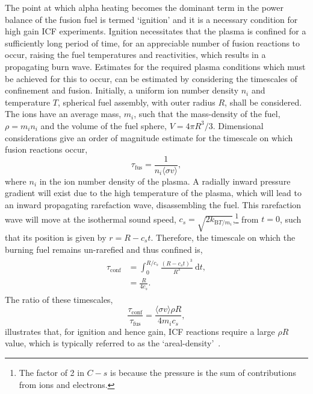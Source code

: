 The point at which alpha heating becomes the dominant term in the power balance of the fusion fuel is termed `ignition' and it is a necessary condition for high gain \ac{ICF} experiments.
Ignition necessitates that the plasma is confined for a sufficiently long period of time, for an appreciable number of fusion reactions to occur, raising the fuel temperatures and reactivities, which results in a propagating burn wave.
Estimates for the required plasma conditions which must be achieved for this to occur, can be estimated by considering the timescales of confinement and fusion.
Initially, a uniform ion number density $n_i$ and temperature $T$, spherical fuel assembly, with outer radius $R$, shall be considered.
The ions have an average mass, $m_i$, such that the mass-density of the fuel, $\rho = m_i n_i$ and the volume of the fuel sphere, $V = 4\pi R^3/3$.
Dimensional considerations give an order of magnitude estimate for the timescale on which fusion reactions occur,
\begin{equation}
    \tau_{\text{fus}} = \frac{1}{n_i \langle \sigma v \rangle},
\end{equation}
where $n_i$ in the ion number density of the plasma.
A radially inward pressure gradient will exist due to the high temperature of the plasma, which will lead to an inward propagating rarefaction wave, disassembling the fuel.
This rarefaction wave will move at the isothermal sound speed, $c_s=\sqrt{2k_{\text{B}T/m_i}}$,\footnote{The factor of 2 in $C-s$ is because the pressure is the sum of contributions from ions and electrons.} from $t=0$, such that its position is given by $r=R-c_s t$.
Therefore, the timescale on which the burning fuel remains un-rarefied and thus confined is,
\begin{align}
    \begin{split}
        \tau_{\text{conf}} &= \int_0^{R/c_s} \frac{ {(R - c_s t)}^3 }{R^3} \ \text{d}t,\\
        &= \frac{R}{4 c_s}.
    \end{split}
\end{align}
The ratio of these timescales,
\begin{equation}
    \frac{\tau_{\text{conf}}}{\tau_{\text{fus}}} = \frac{\langle \sigma v \rangle \rho R}{4 m_i c_s},
\end{equation}
illustrates that, for ignition and hence gain, \ac{ICF} reactions require a large $\rho R$ value, which is typically referred to as the `areal-density'~\cite{fraley_thermonuclear_1974}.


